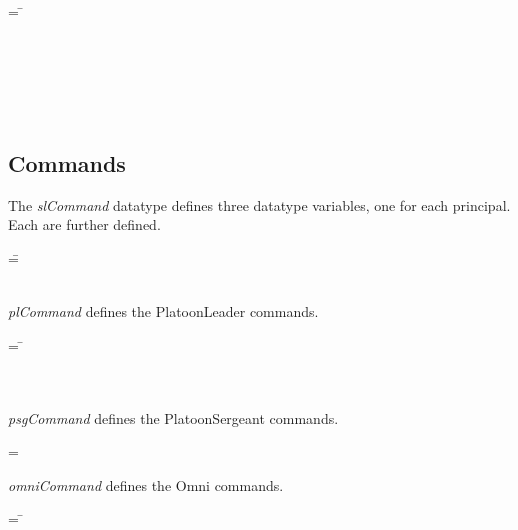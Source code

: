 \documentclass[../../main/main.tex]{subfiles}
\begin{document}
\begin{tabbing}
 = \= \\
					\>\HOLTokenBar{}  \\
					\>\HOLTokenBar{}  \\
					\>\HOLTokenBar{}  \\
					\>\HOLTokenBar{} \\
         				\>\HOLTokenBar{}  \\
					\>\HOLTokenBar{} \end{tabbing}

\subsection{Commands}
The \textit{slCommand} datatype defines three datatype variables, one for each principal.  Each are further defined.
\begin{tabbing}
 =\= \\
  						\>\HOLTokenBar{}  \\
  						\>\HOLTokenBar{}  
\end{tabbing}

\textit{plCommand} defines the PlatoonLeader commands.
\begin{tabbing}
 = \= \\
						\>\HOLTokenBar{}  \\
						\>\HOLTokenBar{}  \\
						\>\HOLTokenBar{} 
\end{tabbing}

\textit{psgCommand} defines the PlatoonSergeant commands.
\begin{tabbing}
 =  \HOLTokenBar{} 
\end{tabbing}

\textit{omniCommand} defines the Omni commands.
\begin{tabbing}
 = \= \\
						\>\HOLTokenBar{} \\
            					\>\HOLTokenBar{}  \\
						\>\HOLTokenBar{} 
\end{tabbing}
\end{document}
